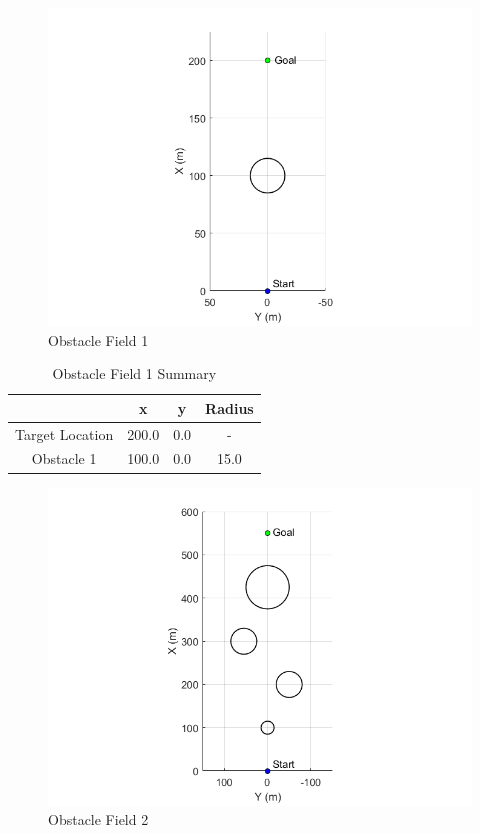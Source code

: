 \documentclass[12pt,twocolumn]{article}
\begin{document}
\begin{figure}
	\centering
	\includegraphics[width=\columnwidth]{Figs/ObstacleField1.png}
	\caption{\small Obstacle Field 1}  
	\label{fig:Obst1}
\end{figure}

\begin{table}
\begin{center}
	\begin{tabular}{||c|c|c|c||} 
		\hline
		& x & y & Radius\\
		\hline
		Target Location  & 200.0 & 0.0 & -\\ 
		\hline
		Obstacle 1 & 100.0 & 0.0 & 15.0\\
		\hline
	\end{tabular}
\end{center}
\caption{Obstacle Field 1 Summary}
\label{t:Obst1Summary}
\end{table}

\begin{figure}
	\centering
	\includegraphics[width=\columnwidth]{Figs/ObstacleField2.png}
	\caption{\small Obstacle Field 2}   
	\label{fig:Obst2}
\end{figure}
\end{document}
